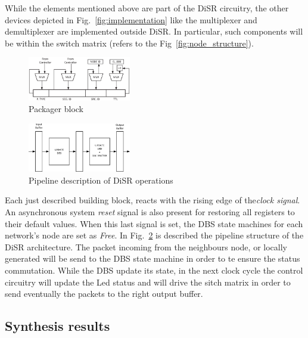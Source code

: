 While the elements mentioned above are part of the DiSR circuitry, 
the other devices depicted in Fig.~\ref{fig:implementation} like the 
multiplexer and demultiplexer are implemented outside DiSR.
In particular, such components will be within the switch matrix 
(refers to the Fig~\ref{fig:node_structure}).

\begin{figure}
  \centering
  \includegraphics[width=0.40\textwidth]{pictures/packager.eps}
  \caption{Packager block}
 \label{fig:packager}
\end{figure}

\begin{figure}
  \centering
  \includegraphics[width=0.40\textwidth]{pictures/pipeline.eps}
  \caption{Pipeline description of DiSR operations}
 \label{fig:pipeline}
\end{figure}

Each just described building block, reacts with the rising edge  of
the\emph{clock signal}. An asynchronous system \emph{reset} signal is
also present for restoring all registers to their default values. When
this last signal is set, the DBS state machines for each network's
node are set as \emph{Free}.  
In Fig.~\ref{fig:pipeline} is described the pipeline structure of the
DiSR architecture. The packet incoming from the neighbours node, or
locally generated will be send to the DBS state machine in order to te
ensure the status commutation. While the DBS update its state,  in the
next clock cycle the control circuitry will update the Led status and
will drive the sitch matrix in order to send eventually the packets to
the  right output buffer.
\subsection{Synthesis results}

